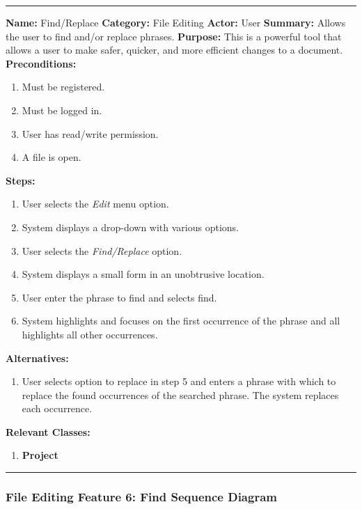 \documentclass[twoside,letterpaper]{article}
\begin{document}
\vspace{2pt}
\hrule
\vspace{8pt}
	\noindent\textbf{Name:} Find/Replace \newline
	\noindent\textbf{Category:} File Editing \newline
	\noindent\textbf{Actor:} User \newline
	\noindent\textbf{Summary:} Allows the user to find and/or replace phrases. \newline
	\noindent\textbf{Purpose:} This is a powerful tool that allows a user to make safer, quicker, and more efficient changes to a document. \newline
	\noindent\textbf{Preconditions:}
	\begin{enumerate}
		\item Must be registered.
		\item Must be logged in.
		\item User has read/write permission.
		\item A file is open.
	\end{enumerate}
	\noindent\textbf{Steps:}
	\begin{enumerate}
		\item User selects the \textit{Edit} menu option.
		\item System displays a drop-down with various options.
		\item User selects the \textit{Find/Replace} option.
		\item System displays a small form in an unobtrusive location.
		\item User enter the phrase to find and selects find.
		\item System highlights and focuses on the first occurrence of the phrase and all highlights all other occurrences.
	\end{enumerate}
	\noindent\textbf{Alternatives:}
	\begin{enumerate}
		\item User selects option to replace in step 5 and enters a phrase with which to replace the found occurrences of the searched phrase. The system replaces each occurrence.
	\end{enumerate}
	\noindent\textbf{Relevant Classes:}
	\begin{enumerate}
		\item \textbf{Project}
	\end{enumerate}
\hrule
\vspace{8pt}
\newpage

\subsubsection[File Editing Feature 6: Find Sequence Diagram]{\rmfamily\bfseries\color{black}
	File Editing Feature 6: Find Sequence Diagram}
\hypertarget{RefHeading22059017292}{}
\end{document}

